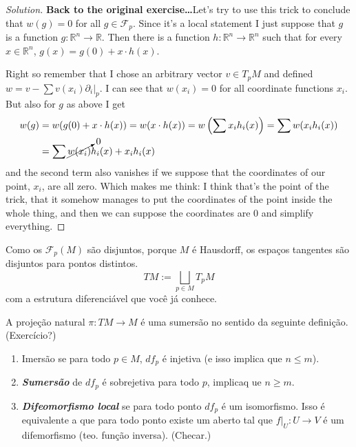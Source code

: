 \begin{proof}[Solution]
{\color{6}\bfseries Back to the original exercise…}\hspace{.5em}Let's try to use this trick to conclude that \(w(g)=0\) for all \(g \in \mathcal{F}_p\). Since it's a local statement I just suppose that \(g\) is a function  \(g: \mathbb{R}^n \to \mathbb{R}\). Then there is a function \(h:\mathbb{R}^n \to \mathbb{R}^n\) such that for every \(x \in \mathbb{R}^n\), \(g(x)=g(0)+x\cdot h(x)\).

Right so remember that I chose an arbitrary vector \(v \in T_pM\) and defined \(w=v-\sum v(x_i)\partial_i|_{p}\). I can see that \(w(x_i)=0\) for all coordinate functions \(x_i\). But also for \(g\) as above I get
\begin{align*}
w(g)&=w(g(0)+x\cdot h(x))=w(x \cdot  h(x))=w\left(\sum x_i h_i(x)\right) =\sum w(x_i h_i(x))\\
&=\sum \cancelto{0}{w(x_i)}h_i(x)+x_ih_i(x)
\end{align*}
and the second term also vanishes if we suppose that the coordinates of our point, \(x_i\), are all zero. {\color{2}Which makes me think: I think that's the point of the trick, that it somehow manages to put the coordinates of the point inside the whole thing, and then we can suppose the coordinates are 0 and simplify everything}.
\end{proof}

\begin{defn}\leavevmode
Como os \(\mathcal{F}_p(M)\) são disjuntos, porque \(M\) é Hausdorff, os espaços tangentes são disjuntos para pontos distintos.
\[TM:=\bigsqcup_{p \in M}T_pM\]
com a estrutura diferenciável que você já conhece.

A projeção natural \(\pi:TM \to M\) é uma sumersão no sentido da seguinte definição. (Exercício?)
\end{defn}

\begin{defn}\leavevmode
\begin{enumerate}
\item Imersão se para todo \(p \in M\), \(df_p\) é injetiva (e isso implica que \(n \leq  m\)).
\item \textit{\textbf{Sumersão}} de \(df_p\) é sobrejetiva para todo \(p\), implicaq ue \( n \geq  m\).
\item \textit{\textbf{Difeomorfismo local}} se para todo ponto \(df_p\) é um isomorfismo. Isso é equivalente a que para todo ponto existe um aberto tal que \(f|_{U}:U \to V\) é um difemorfismo (teo. função inversa). (Checar.)
\end{enumerate}
\end{defn}

